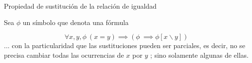 \begin{axiom} \label{eq_subs} Propiedad de sustitución de la relación de igualdad
\begin{center}
	Sea $\phi$ un símbolo que denota una fórmula
\end{center}
	\begin{equation}
		\forall x,y,\phi\ (x=y) \implies (\phi\ \implies \phi[x \backslash y])
	\end{equation}
... con la particularidad que las sustituciones pueden ser parciales, es decir, no se precisa cambiar todas las ocurrencias de $x$ por $y$ ; sino solamente algunas de ellas.
\end{axiom}
